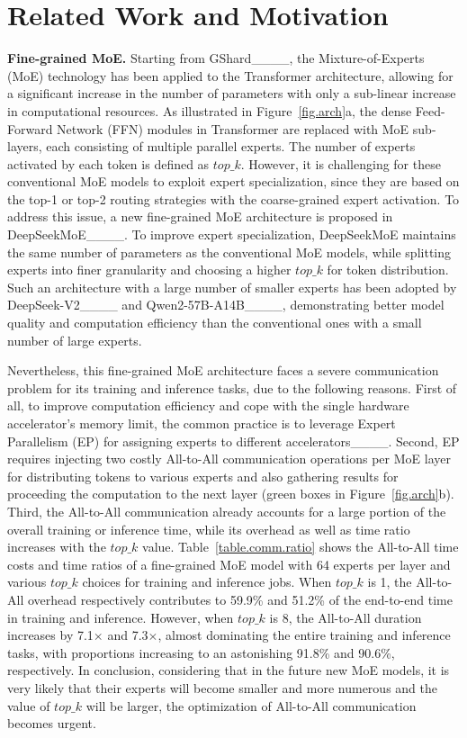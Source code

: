 \section{Related Work and Motivation}
\label{sec:related}

\noindent\textbf{Fine-grained MoE.} 
Starting from GShard____, the Mixture-of-Experts (MoE) technology has been applied to the Transformer architecture, allowing for a significant increase in the number of parameters with only a sub-linear increase in computational resources. 
As illustrated in Figure~\ref{fig.arch}a, the dense Feed-Forward Network (FFN) modules in Transformer are replaced with MoE sub-layers, each consisting of multiple parallel experts. 
The number of experts activated by each token is defined as $top\_k$. 
However, it is challenging for these conventional MoE models to exploit expert specialization, since they are based on the top-1 or top-2 routing strategies with the coarse-grained expert activation. 
To address this issue, a new fine-grained MoE architecture is proposed in DeepSeekMoE____. 
To improve expert specialization, DeepSeekMoE maintains the same number of parameters as the conventional MoE models, while splitting experts into finer granularity and choosing a higher $top\_k$ for token distribution. 
Such an architecture with a large number of smaller experts has been adopted by DeepSeek-V2____ and Qwen2-57B-A14B____, demonstrating better model quality and computation efficiency than the conventional ones with a small number of large experts. 

Nevertheless, this fine-grained MoE architecture faces a severe communication problem for its training and inference tasks, due to the following reasons. 
First of all, to improve computation efficiency and cope with the single hardware accelerator's memory limit, the common practice is to leverage Expert Parallelism (EP) for assigning experts to different accelerators____. 
Second, EP requires injecting two costly All-to-All communication operations per MoE layer for distributing tokens to various experts and also gathering results for proceeding the computation to the next layer (green boxes in Figure~\ref{fig.arch}b). 
Third, the All-to-All communication already accounts for a large portion of the overall training or inference time, while its overhead as well as time ratio increases with the $top\_k$ value. 
Table~\ref{table.comm.ratio} shows the All-to-All time costs and time ratios of a fine-grained MoE model with 64 experts per layer and various $top\_k$ choices for training and inference jobs. 
When $top\_k$ is 1, the All-to-All overhead respectively contributes to 59.9\% and 51.2\% of the end-to-end time in training and inference. 
However, when $top\_k$ is 8, the All-to-All duration increases by 7.1$\times$ and 7.3$\times$, almost dominating the entire training and inference tasks, with proportions increasing to an astonishing 91.8\% and 90.6\%, respectively. 
In conclusion, considering that in the future new MoE models, it is very likely that their experts will become smaller and more numerous and the value of $top\_k$ will be larger, the optimization of All-to-All communication becomes urgent.



